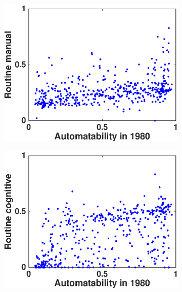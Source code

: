 \documentclass[11pt]{report}
\numberwithin{equation}{chapter}
\begin{document}
\begin{spacing}{2}
\begin{figure}[!htb]
\begin{subfigure}{0.5\textwidth}
\centering
	\includegraphics[scale = 0.5]{routine_manual.eps}
\end{subfigure}%
\begin{subfigure}{0.5\textwidth}
\centering
	\includegraphics[scale = 0.5]{routine_cognitive.eps}
\end{subfigure}\\


\end{figure}
\end{spacing}
\end{document}
